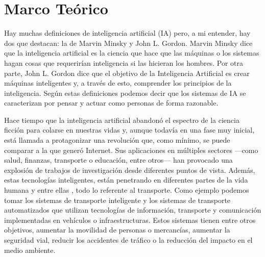 
\chapter{Marco Teórico}
\label{marcoteorico}


Hay muchas definiciones de inteligencia artificial (IA) pero, a mi entender, hay dos que destacan: la de Marvin Minsky y John L. Gordon. Marvin Minsky dice que la inteligencia
artificial es la ciencia que hace que las máquinas o los sistemas hagan cosas que requerirían inteligencia si las hicieran los hombres. Por otra parte, John L. Gordon dice que el objetivo de la Inteligencia Artificial es crear máquinas inteligentes y, a través de esto, comprender los principios de la inteligencia. Según estas definiciones podemos decir que los sistemas de IA se caracterizan por pensar y actuar como personas de forma razonable.


Hace tiempo que la inteligencia artificial abandonó el espectro de la ciencia ficción para colarse en nuestras vidas y, aunque todavía en una fase muy inicial, está llamada a protagonizar una revolución que, como mínimo, se puede comparar a la que generó Internet. Sus aplicaciones en múltiples sectores —como salud, finanzas, transporte o educación, entre otros— han provocado una explosión de trabajos de investigación desde diferentes puntos de vista. Además, estas tecnologías inteligentes, están penetrando en diferentes partes de la vida humana y entre ellas , todo lo referente al transporte. Como ejemplo podemos tomar los sistemas de transporte inteligente y los sistemas de transporte automatizados que utilizan tecnologías de información, transporte y comunicación implementadas en vehículos o infraestructuras. Estos sistemas tienen entre otros objetivos, aumentar la movilidad de personas o mercancías, aumentar la seguridad vial, reducir los accidentes de tráfico o la reducción del impacto en el medio ambiente.


